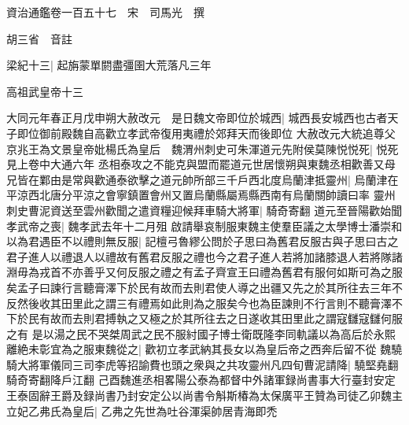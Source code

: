 資治通鑑卷一百五十七　宋　司馬光　撰

胡三省　音註

梁紀十三|{
	起旃蒙單閼盡彊圉大荒落凡三年}


高祖武皇帝十三

大同元年春正月戊申朔大赦改元　是日魏文帝即位於城西|{
	城西長安城西也古者天子即位御前殿魏自高歡立孝武帝復用夷禮於郊拜天而後即位}
大赦改元大統追尊父京兆王為文景皇帝妣楊氏為皇后　魏渭州刺史可朱渾道元先附侯莫陳悦悦死|{
	悦死見上卷中大通六年}
丞相泰攻之不能克與盟而罷道元世居懷朔與東魏丞相歡善又母兄皆在鄴由是常與歡通泰欲擊之道元帥所部三千戶西北度烏蘭津抵靈州|{
	烏蘭津在平涼西北唐分平涼之會寧鎮置會州又置烏蘭縣屬焉縣西南有烏蘭關帥讀曰率}
靈州刺史曹泥資送至雲州歡聞之遣資糧迎候拜車騎大將軍|{
	騎奇寄翻}
道元至晉陽歡始聞孝武帝之喪|{
	魏孝武去年十二月殂}
啟請舉哀制服東魏主使羣臣議之太學博士潘崇和以為君遇臣不以禮則無反服|{
	記檀弓魯繆公問於子思曰為舊君反服古與子思曰古之君子進人以禮退人以禮故有舊君反服之禮也今之君子進人若將加諸膝退人若將隊諸淵毋為戎首不亦善乎又何反服之禮之有孟子齊宣王曰禮為舊君有服何如斯可為之服矣孟子曰諫行言聽膏澤下於民有故而去則君使人導之出疆又先之於其所往去三年不反然後收其田里此之謂三有禮焉如此則為之服矣今也為臣諫則不行言則不聽膏澤不下於民有故而去則君搏執之又極之於其所往去之日遂收其田里此之謂寇讎寇讎何服之有}
是以湯之民不哭桀周武之民不服紂國子博士衛既隆李同軌議以為高后於永熙離絶未彰宜為之服東魏從之|{
	歡初立孝武納其長女以為皇后帝之西奔后留不從}
魏驍騎大將軍儀同三司李虎等招諭費也頭之衆與之共攻靈州凡四旬曹泥請降|{
	驍堅堯翻騎奇寄翻降戶江翻}
己酉魏進丞相畧陽公泰為都督中外諸軍録尚書事大行臺封安定王泰固辭王爵及録尚書乃封安定公以尚書令斛斯椿為太保廣平王贊為司徒乙卯魏主立妃乙弗氏為皇后|{
	乙弗之先世為吐谷渾渠帥居青海即禿}



